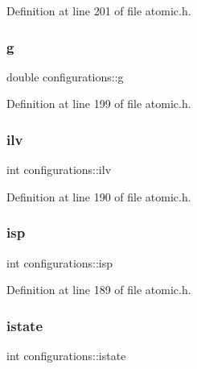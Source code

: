 Definition at line 201 of file atomic.\+h.

\mbox{\label{structconfigurations_a568aa359240b411f0774506fb0857f7c}} 
\subsubsection{\texorpdfstring{g}{g}}
{\footnotesize\ttfamily double configurations\+::g}



Definition at line 199 of file atomic.\+h.

\mbox{\label{structconfigurations_a5282ad8d6e8d97c88fd8b18ecfe10125}} 
\subsubsection{\texorpdfstring{ilv}{ilv}}
{\footnotesize\ttfamily int configurations\+::ilv}



Definition at line 190 of file atomic.\+h.

\mbox{\label{structconfigurations_ab682115e8a37d6e26f14720187498611}} 
\subsubsection{\texorpdfstring{isp}{isp}}
{\footnotesize\ttfamily int configurations\+::isp}



Definition at line 189 of file atomic.\+h.

\mbox{\label{structconfigurations_a03fea0f1f2b5829f8af02ef8fcb74396}} 
\subsubsection{\texorpdfstring{istate}{istate}}
{\footnotesize\ttfamily int configurations\+::istate}



